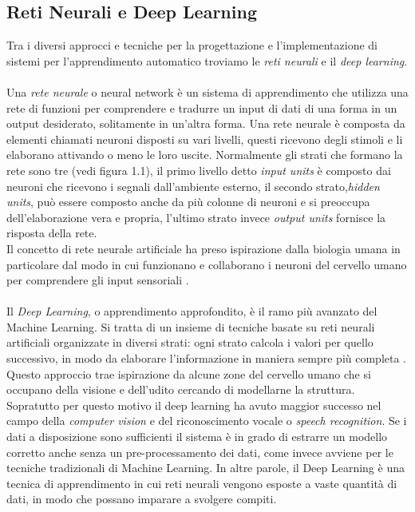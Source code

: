\subsection{Reti Neurali e Deep Learning}
Tra i diversi approcci e tecniche per la progettazione e l'implementazione di sistemi per l'apprendimento automatico troviamo le \textit{reti neurali} e il \textit{deep learning}.\\\\
Una \textit{rete neurale} o neural network è un sistema di apprendimento che utilizza una rete di funzioni per comprendere e tradurre un input di dati di una forma in un output desiderato, solitamente in un'altra forma. Una rete neurale è composta da elementi chiamati neuroni disposti su vari livelli, questi ricevono degli stimoli e li elaborano attivando o meno le loro uscite.  Normalmente gli strati che formano la rete sono tre (vedi figura 1.1), il primo livello detto \textit{input units} è composto dai neuroni che ricevono i segnali dall'ambiente esterno, il secondo strato,\textit{hidden units}, può essere composto anche da più colonne di neuroni e si preoccupa dell'elaborazione vera e propria, l'ultimo strato invece \textit{output units} fornisce la risposta della rete.\\
Il concetto di rete neurale artificiale ha preso ispirazione dalla biologia umana in particolare dal modo in cui funzionano e collaborano i neuroni del cervello umano per comprendere gli input sensoriali \cite{neuralnet}.\\\\ 
Il \textit{Deep Learning}, o apprendimento approfondito, è il ramo più avanzato del Machine Learning. Si tratta di un insieme di tecniche basate su reti neurali artificiali organizzate in diversi strati: ogni strato calcola i valori per quello successivo, in modo da elaborare l’informazione in maniera sempre più completa \cite{polimi}. Questo approccio trae ispirazione da alcune zone del cervello umano che si occupano della visione e dell'udito cercando di modellarne la struttura. Sopratutto per questo motivo il deep learning ha avuto maggior successo nel campo della \textit{computer vision} e del riconoscimento vocale o \textit{speech recognition}.
Se i dati a disposizione sono sufficienti il sistema è in grado di estrarre un modello corretto anche senza un pre-processamento dei dati, come invece avviene per le tecniche tradizionali di Machine Learning. In altre parole, il Deep Learning è una tecnica di apprendimento in cui reti neurali vengono esposte a vaste quantità di dati, in modo che possano imparare a svolgere compiti.\\\\
